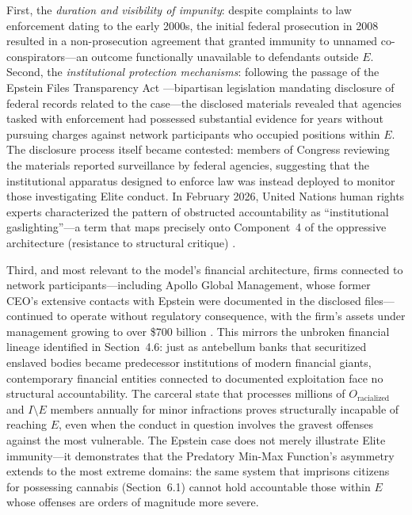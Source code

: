 \documentclass[12pt,openany]{book}
\begin{document}
First, the \textit{duration and visibility of impunity}: despite complaints to law enforcement dating to the early 2000s, the initial federal prosecution in 2008 resulted in a non-prosecution agreement that granted immunity to unnamed co-conspirators---an outcome functionally unavailable to defendants outside $E$. Second, the \textit{institutional protection mechanisms}: following the passage of the Epstein Files Transparency Act \cite{epsteinact}---bipartisan legislation mandating disclosure of federal records related to the case---the disclosed materials revealed that agencies tasked with enforcement had possessed substantial evidence for years without pursuing charges against network participants who occupied positions within $E$. The disclosure process itself became contested: members of Congress reviewing the materials reported surveillance by federal agencies, suggesting that the institutional apparatus designed to enforce law was instead deployed to monitor those investigating Elite conduct. In February 2026, United Nations human rights experts characterized the pattern of obstructed accountability as ``institutional gaslighting''---a term that maps precisely onto Component~4 of the oppressive architecture (resistance to structural critique) \cite{ohchr2026}.

Third, and most relevant to the model's financial architecture, firms connected to network participants---including Apollo Global Management, whose former CEO's extensive contacts with Epstein were documented in the disclosed files---continued to operate without regulatory consequence, with the firm's assets under management growing to over \$700 billion \cite{apolloepstein}. This mirrors the unbroken financial lineage identified in Section~4.6: just as antebellum banks that securitized enslaved bodies became predecessor institutions of modern financial giants, contemporary financial entities connected to documented exploitation face no structural accountability. The carceral state that processes millions of $O_{\text{racialized}}$ and $I \setminus E$ members annually for minor infractions proves structurally incapable of reaching $E$, even when the conduct in question involves the gravest offenses against the most vulnerable. The Epstein case does not merely illustrate Elite immunity---it demonstrates that the Predatory Min-Max Function's asymmetry extends to the most extreme domains: the same system that imprisons citizens for possessing cannabis (Section~6.1) cannot hold accountable those within $E$ whose offenses are orders of magnitude more severe.
\end{document}
